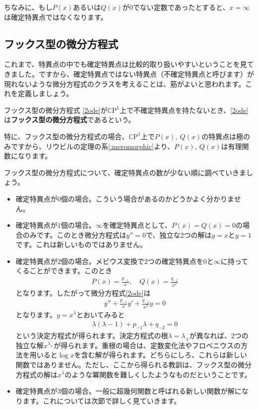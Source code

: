 \documentclass[report,paper=a4, fontsize=12pt, line_length=16cm, number_of_lines=33,dvipdfmx]{jlreq}
\numberwithin{equation}{section}
\newcommand{\Cb}{\mathbb{C}}
\newcommand{\CP}{\Cb \mathrm{P}}
\newcommand{\strong}[1]{\textsf{\bfseries #1}}
\begin{document}
ちなみに、もし$P(x)$あるいは$Q(x)$が$0$でない定数であったとすると、$x=\infty$は確定特異点ではなくなります。

\subsection{フックス型の微分方程式}
これまで、特異点の中でも確定特異点は比較的取り扱いやすいということを見てきました。ですから、確定特異点ではない特異点（不確定特異点と呼びます）が現れないような微分方程式のクラスを考えることは、筋がよいと思われます。これを定義しましょう。
\begin{definition}{フックス型の微分方程式}{}
  \eqref{2ode}が$\CP^1$上で不確定特異点を持たないとき、\eqref{2ode}は\strong{フックス型の微分方程式}であるという。
\end{definition}
特に、フックス型の微分方程式の場合、$\CP^1$上で$P(x),\ Q(x)$の特異点は極のみですから、リウビルの定理の系\ref{:meromorphic}より、$P(x),\ Q(x)$は有理関数になります。


フックス型の微分方程式について、確定特異点の数が少ない順に調べていきましょう。
\begin{itemize}
  \item 確定特異点が$0$個の場合。こういう場合があるのかどうかよく分かりません。
  \item 確定特異点が$1$個の場合。$\infty$を確定特異点として、$P(x)=Q(x)=0$の場合のみです。このとき微分方程式は$y''=0$で、独立な2つの解は$y=x$と$y=1$です。これは新しいものではありません。
  \item 確定特異点が$2$個の場合。メビウス変換で2つの確定特異点を$0$と$\infty$に持ってくることができます。このとき
  \begin{align}
    P(x)=\frac{p_{-1}}{x},\quad Q(x)=\frac{q_{-2}}{x^2}
  \end{align}
  となります。したがって微分方程式\eqref{2ode}は
  \begin{align}
    y''+\frac{p_{-1}}{x}y'+\frac{q_{-2}}{x^2}y=0
  \end{align}
  となります。$y=x^{\lambda}$とおいてみると
  \begin{align}
    \lambda(\lambda-1)+p_{-1}\lambda+q_{-2}=0
  \end{align}
  という決定方程式が得られます。決定方程式の根$\lambda=\lambda_{\pm}$が異なれば、2つの独立な解$x^{\lambda_{\pm}}$が得られます。重根の場合は、定数変化法やフロベニウスの方法を用いると$\log x$を含む解が得られます。どちらにしろ、これらは新しい関数ではありません。ただし、ここから得られる教訓は、フックス型の微分方程式の解は$x^{\lambda}$のような冪関数を難しくしたようなものだということです。
  \item 確定特異点が3個の場合。一般に超幾何関数と呼ばれる新しい関数が解になります。これについては次節で詳しく見ていきます。
\end{itemize}
\end{document}
